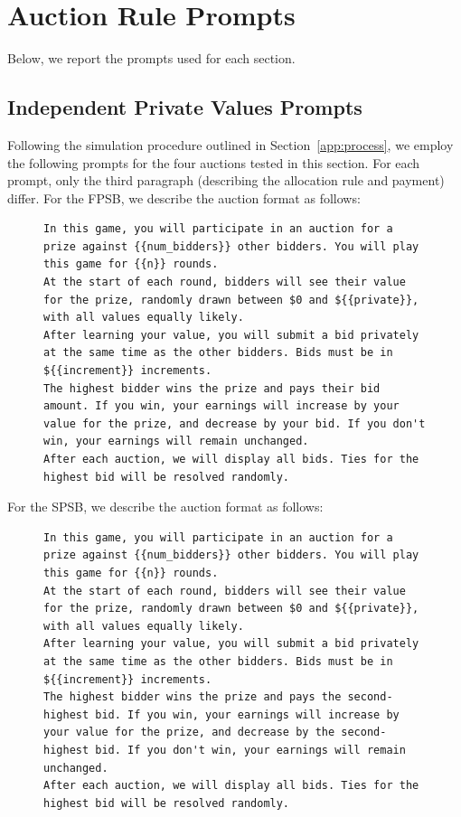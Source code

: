 \newpage

\section{Auction Rule Prompts}\label{app:prompt}
Below, we report the prompts used for each section.

\subsection{Independent Private Values Prompts}\label{sec:ipv-prompts}
Following the simulation procedure outlined in Section~\ref{app:process}, we employ the following prompts for the four auctions tested in this section. For each prompt, only the third paragraph (describing the allocation rule and payment) differ. For the FPSB, we describe the auction format as follows:
\begin{figure}
\centering
\begin{minipage}{0.95\textwidth}
\begin{lstlisting}
In this game, you will participate in an auction for a prize against {{num_bidders}} other bidders. You will play this game for {{n}} rounds.
At the start of each round, bidders will see their value for the prize, randomly drawn between $0 and ${{private}}, with all values equally likely.
After learning your value, you will submit a bid privately at the same time as the other bidders. Bids must be in ${{increment}} increments.
The highest bidder wins the prize and pays their bid amount. If you win, your earnings will increase by your value for the prize, and decrease by your bid. If you don't win, your earnings will remain unchanged.
After each auction, we will display all bids. Ties for the highest bid will be resolved randomly.
\end{lstlisting}
\end{minipage}
\label{fig:sealbid_prompt}
\end{figure}


For the SPSB, we describe the auction format as follows:
\begin{figure}
\centering
\begin{minipage}{0.95\textwidth}
\begin{lstlisting}
In this game, you will participate in an auction for a prize against {{num_bidders}} other bidders. You will play this game for {{n}} rounds.
At the start of each round, bidders will see their value for the prize, randomly drawn between $0 and ${{private}}, with all values equally likely.
After learning your value, you will submit a bid privately at the same time as the other bidders. Bids must be in ${{increment}} increments.
The highest bidder wins the prize and pays the second-highest bid. If you win, your earnings will increase by your value for the prize, and decrease by the second-highest bid. If you don't win, your earnings will remain unchanged.
After each auction, we will display all bids. Ties for the highest bid will be resolved randomly.
\end{lstlisting}
\end{minipage}
\label{fig:sealbid_prompt}
\end{figure}


